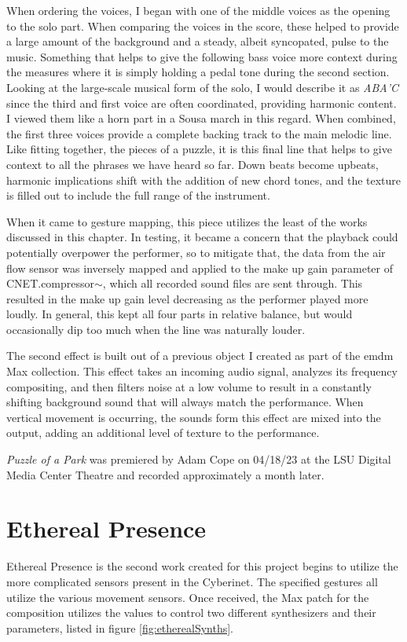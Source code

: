 When ordering the voices, I began with one of the middle voices as the opening to the solo part. When comparing the voices in the score, these helped to provide a large amount of the background and a steady, albeit syncopated, pulse to the music. Something that helps to give the following bass voice more context during the measures where it is simply holding a pedal tone during the second section. Looking at the large-scale musical form of the solo, I would describe it as \emph{ABA'C} since the third and first voice are often coordinated, providing harmonic content. I viewed them like a horn part in a Sousa march in this regard. When combined, the first three voices provide a complete backing track to the main melodic line. Like fitting together, the pieces of a puzzle, it is this final line that helps to give context to all the phrases we have heard so far. Down beats become upbeats, harmonic implications shift with the addition of new chord tones, and the texture is filled out to include the full range of the instrument.

When it came to gesture mapping, this piece utilizes the least of the works discussed in this chapter. In testing, it became a concern that the playback could potentially overpower the performer, so to mitigate that, the data from the air flow sensor was inversely mapped and applied to the make up gain parameter of CNET.compressor$\sim$, which all recorded sound files are sent through. This resulted in the make up gain level decreasing as the performer played more loudly. In general, this kept all four parts in relative balance, but would occasionally dip too much when the line was naturally louder.

The second effect is built out of a previous object I created as part of the emdm Max collection. This effect takes an incoming audio signal, analyzes its frequency compositing, and then filters noise at a low volume to result in a constantly shifting background sound that will always match the performance. When vertical movement is occurring, the sounds form this effect are mixed into the output, adding an additional level of texture to the performance.

\textit{Puzzle of a Park} was premiered by Adam Cope on 04/18/23 at the LSU Digital Media Center Theatre and recorded approximately a month later.

\section{Ethereal Presence}
Ethereal Presence is the second work created for this project begins to utilize the more complicated sensors present in the Cyberinet. The specified gestures all utilize the various movement sensors. Once received, the Max patch for the composition utilizes the values to control two different synthesizers and their parameters, listed in figure \ref{fig:etherealSynths}. 

